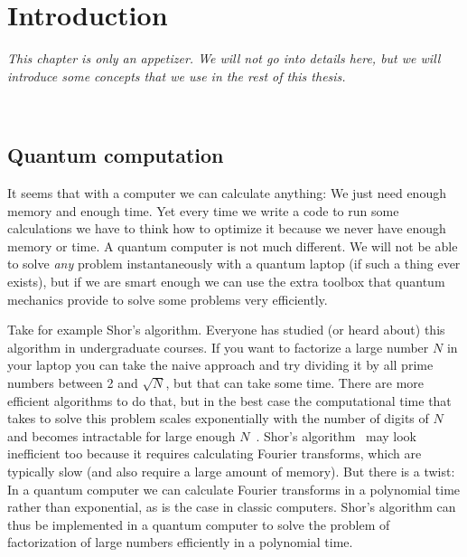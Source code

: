
\chapter{Introduction\label{sec:intro}}

\hfill%
\begin{minipage}{0.85\textwidth}
\em
%
This chapter is only an appetizer. We will not go into details here, but we will introduce some concepts that we use in the rest of this thesis.
\end{minipage}\\
\vspace{3ex}





\section{Quantum computation}

It seems that with a computer we can calculate anything: We just need enough memory and enough time. Yet every time we write a code to run some calculations we have to think how to optimize it because we never have enough memory or time.
%
A quantum computer is not much different. We will not be able to solve \textit{any} problem instantaneously with a quantum laptop (if such a thing ever exists), but if we are smart enough we can use the extra toolbox that quantum mechanics provide to solve some problems very efficiently.

Take for example Shor's algorithm. Everyone has studied (or heard about) this algorithm in undergraduate courses.
%
If you want to factorize a large number $N$ in your laptop you can take the naive approach and try dividing it by all prime numbers between 2 and $\sqrt N$, but that can take some time. There are more efficient algorithms to do that, but in the best case the computational time that takes to solve this problem scales exponentially with the number of digits of $N$ and becomes intractable for large enough $N$~\cite{Nielsen2010}.
%
Shor's algorithm~\cite{Shor1994,Ekert1996,Nielsen2010} may look inefficient too because it requires calculating Fourier transforms, which are typically slow (and also require a large amount of memory). But there is a twist: In a quantum computer we can calculate Fourier transforms in a polynomial time rather than exponential, as is the case in classic computers.
%
Shor's algorithm can thus be implemented in a quantum computer to solve the problem of factorization of large numbers efficiently in a polynomial time.




